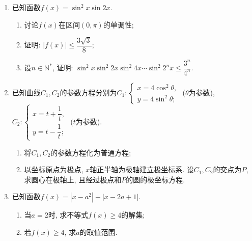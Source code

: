\begin{description}
\begin{enumerate}[leftmargin=5pt]
        \begin{enumerate}[label=(\arabic*)]
            \item 证明: $AA_1\parallel MN$, 且平面$A_1AMN\perp$平面$EB_1C_1F$;
            \item 设$O$为$\triangle A_1B_1C_1$的中心, 若$AO\parallel$平面$EB_1C_1F$, 且$AO=AB$, 求直线$B_1E$与平面$A_1AMN$所成角的正弦值.
        \end{enumerate}
        
        \item 已知函数$f(x)=\sin^{2}x\sin 2x$.
        \begin{enumerate}[label=(\arabic*)]
            \item 讨论$f(x)$在区间$(0,\pi)$的单调性;
            \item 证明: $|f(x)|\leqslant\dfrac{3\sqrt{3}}{8}$;
            \item 设$n\in\mathbb{N}^{*}$, 证明: $\sin^{2}x\sin^{2}2x\sin^{2}4x\cdots\sin^{2}2^{n}x\leqslant\dfrac{3^{n}}{4^{n}}$.
        \end{enumerate}
        
        \item 已知曲线$C_1,C_2$的参数方程分别为$C_1:\begin{cases}x=4\cos^{2}\theta,\\y=4\sin^{2}\theta;\end{cases}$ ($\theta$为参数), $C_2:\begin{cases}x=t+\dfrac{1}{t},\\[6pt]y=t-\dfrac{1}{t};\end{cases}$ ($t$为参数).
        \begin{enumerate}[label=(\arabic*)]
            \item 将$C_1,C_2$的参数方程化为普通方程;
            \item 以坐标原点为极点, $x$轴正半轴为极轴建立极坐标系. 设$C_1,C_2$的交点为$P$, 求圆心在极轴上, 且经过极点和$P$的圆的极坐标方程.
        \end{enumerate}
        
        \item 已知函数$f(x)=|x-a^{2}|+|x-2a+1|$.
        \begin{enumerate}[label=(\arabic*)]
            \item 当$a=2$时, 求不等式$f(x)\geqslant 4$的解集;
            \item 若$f(x)\geqslant 4$, 求$a$的取值范围.
        \end{enumerate}
        
    \end{enumerate}
\end{description}
\clearpage


